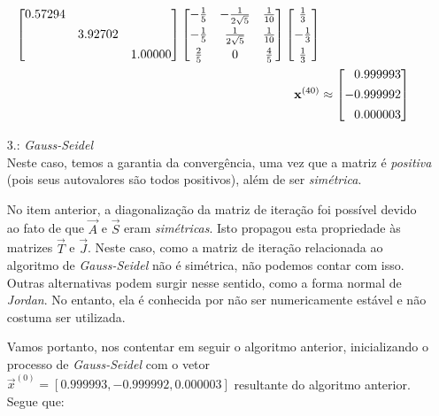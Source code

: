 \documentclass{homework}
\begin{document}
\begin{enumerate}[wide, leftmargin=80pt]
\begin{align*}
				\left[ %
				\begin{array}{@{}ccc@{}}
				0.57294& ~ & ~ \\[1ex]
				~ & 3.92702 & ~ \\[1ex]
				~ & ~ & 1.00000
				\end{array}
				\right] %
				\left[ %
				\begin{array}{@{}ccc@{}}
				-\frac{1}{5} & -\frac{1}{2 \sqrt{5}} & \frac{1}{10} \\[1ex]
				-\frac{1}{5} & \frac{1}{2 \sqrt{5}} & \frac{1}{10} \\[1ex]
				\frac{2}{5} & 0 & \frac{4}{5}
				\end{array}%
				\right]
				\left[ %
				\begin{array}{@{}c@{}}
				\frac{1}{3} \\[1ex]
				-\frac{1}{3} \\[1ex]
				\frac{1}{3} 
				\end{array}
				\right]\\
				\vec{x}^{(40)} &\approx
				\left[
				\begin{array}{@{}c@{}}
				\phantom{-}0.999993\\[1ex]
				-0.999992\\[1ex]
				\phantom{-}0.000003
				\end{array}\right]
			\end{align*}
			
			\item[3.: \textit{Gauss-Seidel}]~\\
			
			Neste caso, temos a garantia da convergência, uma vez que a matriz é \textit{positiva} (pois seus autovalores são todos positivos), além de ser \textit{simétrica}.\par
			
			No item anterior, a diagonalização da matriz de iteração foi possível devido ao fato de que $\vec{A}$ e $\vec{S}$ eram \textit{simétricas}. Isto propagou esta propriedade às matrizes $\vec{T}$ e $\vec{J}$. Neste caso, como a matriz de iteração relacionada ao algoritmo de \textit{Gauss-Seidel} não é simétrica, não podemos contar com isso. Outras alternativas podem surgir nesse sentido, como a forma normal de \textit{Jordan}. No entanto, ela é conhecida por não ser numericamente estável e não costuma ser utilizada.\par
			
			Vamos portanto, nos contentar em seguir o algoritmo anterior, inicializando o processo de \textit{Gauss-Seidel} com o vetor $\vec{x}^{(0)} = \left[0.999993,-0.999992, 0.000003\right]$ resultante do algoritmo anterior. Segue que:\par
			

\end{enumerate}
\end{document}
